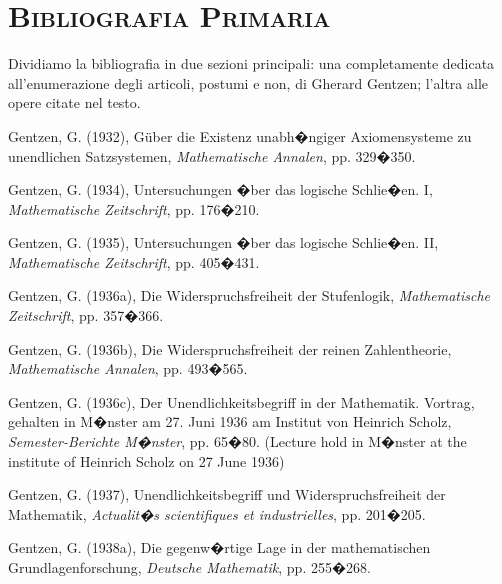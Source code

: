 \documentclass[a4paper,12pt]{aphex}
\begin{document}
\section{\textsc{Bibliografia Primaria}}



Dividiamo la bibliografia in due sezioni principali: una completamente dedicata all'enumerazione degli articoli, postumi e non, di Gherard Gentzen; l'altra alle opere citate nel testo.

\vspace{0.6cm}


 Gentzen, G. (1932), G\"uber die Existenz unabh�ngiger Axiomensysteme zu unendlichen Satzsystemen, \emph{Mathematische Annalen}, pp. 329�350. 

\vspace{0.1cm}

 Gentzen, G. (1934), Untersuchungen �ber das logische Schlie�en. I, \emph{Mathematische Zeitschrift}, pp. 176�210.
 
 \vspace{0.1cm}


 Gentzen, G. (1935), Untersuchungen �ber das logische Schlie�en. II,  \emph{Mathematische Zeitschrift}, pp. 405�431. 
 
 \vspace{0.1cm}


Gentzen, G. (1936a), Die Widerspruchsfreiheit der Stufenlogik, \emph{Mathematische Zeitschrift}, pp.  357�366. 

\vspace{0.1cm}


Gentzen, G. (1936b), Die Widerspruchsfreiheit der reinen Zahlentheorie, \emph{Mathematische Annalen}, pp. 493�565. 

\vspace{0.1cm}


Gentzen, G. (1936c), Der Unendlichkeitsbegriff in der Mathematik. Vortrag, gehalten in M�nster am 27. Juni 1936 am Institut von Heinrich Scholz, \emph{Semester-Berichte M�nster}, pp. 65�80.  (Lecture hold in M�nster at the institute of Heinrich Scholz on 27 June 1936)

\vspace{0.1cm}


Gentzen, G. (1937), Unendlichkeitsbegriff und Widerspruchsfreiheit der Mathematik, \emph{Actualit�s scientifiques et industrielles}, pp. 201�205.

\vspace{0.1cm}


Gentzen, G. (1938a), Die gegenw�rtige Lage in der mathematischen Grundlagenforschung, \emph{Deutsche Mathematik}, pp. 255�268. 
\end{document}
